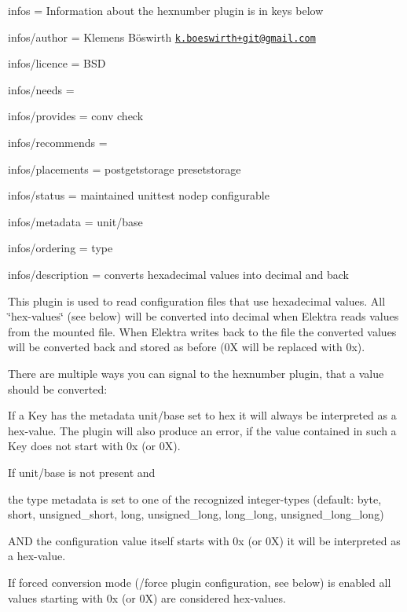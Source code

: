 
\begin{DoxyItemize}
\item infos = Information about the hexnumber plugin is in keys below
\item infos/author = Klemens Böswirth \href{mailto:k.boeswirth+git@gmail.com}{\tt k.\+boeswirth+git@gmail.\+com}
\item infos/licence = B\+SD
\item infos/needs =
\item infos/provides = conv check
\item infos/recommends =
\item infos/placements = postgetstorage presetstorage
\item infos/status = maintained unittest nodep configurable
\item infos/metadata = unit/base
\item infos/ordering = type
\item infos/description = converts hexadecimal values into decimal and back
\end{DoxyItemize}

This plugin is used to read configuration files that use hexadecimal values. All \char`\"{}hex-\/values\char`\"{} (see below) will be converted into decimal when Elektra reads values from the mounted file. When Elektra writes back to the file the converted values will be converted back and stored as before ({\ttfamily 0X} will be replaced with {\ttfamily 0x}).

There are multiple ways you can signal to the hexnumber plugin, that a value should be converted\+:


\begin{DoxyEnumerate}
\item If a Key has the metadata {\ttfamily unit/base} set to {\ttfamily hex} it will always be interpreted as a hex-\/value. The plugin will also produce an error, if the value contained in such a Key does not start with {\ttfamily 0x} (or {\ttfamily 0X}).
\item If {\ttfamily unit/base} is not present and
\begin{DoxyItemize}
\item the {\ttfamily type} metadata is set to one of the recognized integer-\/types (default\+: {\ttfamily byte}, {\ttfamily short}, {\ttfamily unsigned\+\_\+short}, {\ttfamily long}, {\ttfamily unsigned\+\_\+long}, {\ttfamily long\+\_\+long}, {\ttfamily unsigned\+\_\+long\+\_\+long})
\item A\+ND the configuration value itself starts with {\ttfamily 0x} (or {\ttfamily 0X}) it will be interpreted as a hex-\/value.
\end{DoxyItemize}
\item If forced conversion mode ({\ttfamily /force} plugin configuration, see below) is enabled all values starting with {\ttfamily 0x} (or {\ttfamily 0X}) are considered hex-\/values.
\end{DoxyEnumerate}

